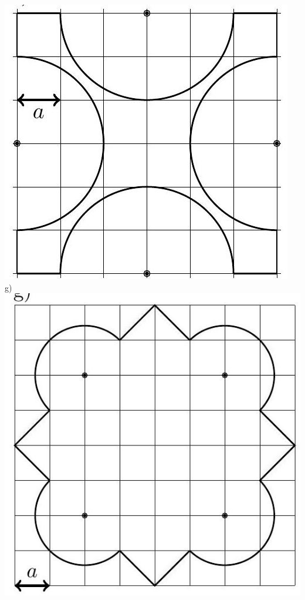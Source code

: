 \documentclass[10pt]{article}
\begin{document}
\begin{enumerate}
\includegraphics[max width=\textwidth, center]{2024_11_21_e9b4faa005d5be2cc318g-060(5)}\\
g)\\
\includegraphics[max width=\textwidth, center]{2024_11_21_e9b4faa005d5be2cc318g-061(4)}\\

\end{enumerate}
\end{document}
